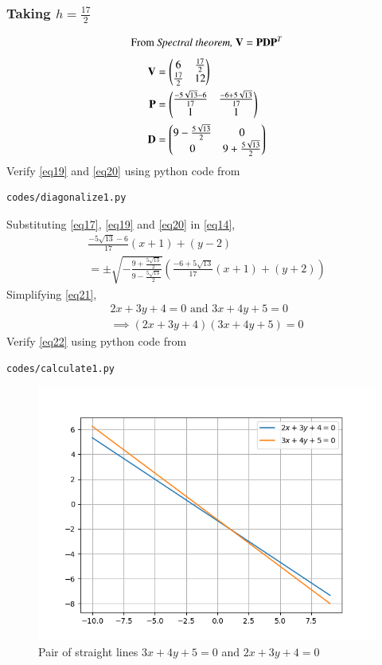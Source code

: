 \documentclass[journal,12pt,twocolumn]{IEEEtran}
\begin{document}
\subsubsection{Taking $h=\frac{17}{2}$}
\begin{equation}
	\text{From \textit{Spectral theorem, }}\vec{V} = \vec{P}\vec{D}\vec{P}^T
\end{equation}
\begin{align}
	\label{eq18}\vec{V} &= \myvec{ 6 & \frac{17}{2}\\ \frac{17}{2} & 12}\\
	\label{eq19}\vec{P} &= \myvec{\frac{-5\sqrt{13} - 6}{17} & \frac{-6 + 5\sqrt{13}}{17}\\ 1 & 1}\\
	\label{eq20}\vec{D} &= \myvec{9 - \frac{5\sqrt{13}}{2} & 0\\ 0 & 9 + \frac{5\sqrt{13}}{2}}
\end{align}
Verify  \eqref{eq19} and \eqref{eq20} using python code from
\begin{lstlisting}
codes/diagonalize1.py
\end{lstlisting}
Substituting \eqref{eq17}, \eqref{eq19} and \eqref{eq20} in \eqref{eq14},
\begin{multline}\label{eq21}
	\frac{-5\sqrt{13} - 6}{17}(x+1) + (y-2) \\= \pm \sqrt{-\frac{9 + \frac{5\sqrt{13}}{2}}{9 - \frac{5\sqrt{13}}{2}}}\left(\frac{-6 + 5\sqrt{13}}{17}(x+1) + (y+2)\right)
\end{multline}
Simplifying \eqref{eq21},
\begin{align}
	\label{eq22}2x + 3y + 4 = 0 \text{ and } 3x + 4y + 5 = 0\\
	\implies (2x + 3y + 4)(3x + 4y + 5) = 0
\end{align}
Verify  \eqref{eq22} using python code from
\begin{lstlisting}
codes/calculate1.py
\end{lstlisting}
\renewcommand{\thefigure}{1}
\begin{figure}[h]
	\centering
	\includegraphics[width=\columnwidth]{fig/figure_1.png}
	\caption{Pair of straight lines $3x + 4y + 5 = 0$ and $2x + 3y + 4 = 0$}
	\label{fig:figure1}
\end{figure}
\end{document}
